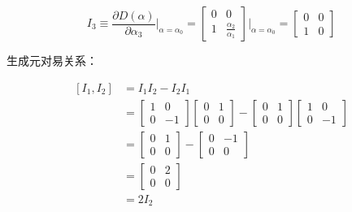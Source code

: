 \begin{equation}
I_3
\equiv \frac{\partial D\left(\alpha\right) }{\partial \alpha_3 }\bigg|_{\alpha=\alpha_0}
=\begin{bmatrix}
0 &0 \\
1 &\frac{\alpha_2 }{\alpha_1 } 
\end{bmatrix} \bigg|_{\alpha=\alpha_0}
=\begin{bmatrix}
0 &0 \\
1 &0
\end{bmatrix}
\end{equation}

生成元对易关系：

\begin{align}
\left[I_1,I_2\right]
&=I_1I_2-I_2I_1 \\
&=\begin{bmatrix}
1 &0 \\
0 &-1
\end{bmatrix}
\begin{bmatrix}
0 &1 \\
0 &0
\end{bmatrix}
-\begin{bmatrix}
0 &1 \\
0 &0
\end{bmatrix}
\begin{bmatrix}
1 &0 \\
0 &-1
\end{bmatrix} \\
&=\begin{bmatrix}
0 &1 \\
0 &0
\end{bmatrix}
-\begin{bmatrix}
0 &-1 \\
0 &0
\end{bmatrix} \\
&=\begin{bmatrix}
0 &2 \\
0 &0
\end{bmatrix} \\
&=2I_2
\end{align}

